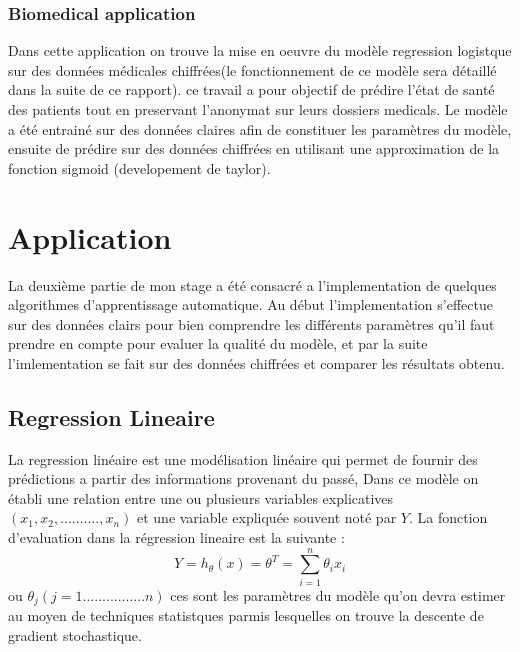 \documentclass[a4paper,12pt]{article}
\begin{document}
\subsubsection{Biomedical application \cite{deowlin2017manual} } 
Dans cette application on trouve la mise en oeuvre du modèle  regression logistque sur des données médicales  chiffrées(le fonctionnement de ce modèle sera détaillé dans la suite de ce rapport). ce travail a pour objectif de prédire l'état de santé des patients tout en preservant l'anonymat sur leurs dossiers medicals.\newline
Le modèle a été entrainé sur des données claires afin de constituer les paramètres du modèle, ensuite de prédire sur des données chiffrées en utilisant une approximation de la fonction sigmoid (developement de taylor). 

\newpage
\newpage
\section{Application}
La deuxième partie de mon stage a été consacré a l'implementation de quelques algorithmes d'apprentissage automatique.\newline
Au début l'implementation s'effectue sur des données clairs pour bien comprendre les différents paramètres qu'il faut prendre en compte pour evaluer la qualité du modèle, et par la suite l'imlementation se fait sur des données chiffrées et comparer les résultats obtenu. \newline      
\subsection {Regression Lineaire}
La regression linéaire est une modélisation linéaire qui permet de fournir des prédictions a partir des informations provenant du passé, 
Dans ce modèle on établi une relation entre une ou plusieurs variables explicatives $(x_1,x_2,..........,x_n)$ et une variable expliquée souvent noté par $Y$.\newline
La fonction d'evaluation dans la régression lineaire est la suivante : \newline
$$Y =h_{\theta}(x) = \theta^T = \sum_{i=1}^{n} \theta_ix_i $$\newline
ou $\theta_j (j=1................n)$ ces sont les paramètres du modèle qu'on devra estimer au moyen de techniques statistques parmis  lesquelles on trouve la descente de gradient stochastique.\newline
\end{document}
